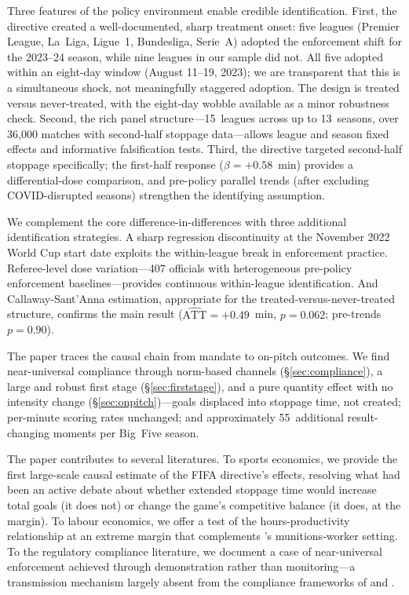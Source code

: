 \medskip

Three features of the policy environment enable credible identification.
First, the directive created a well-documented, sharp treatment onset:
five leagues (Premier League, La~Liga, Ligue~1, Bundesliga, Serie~A)
adopted the enforcement shift for the 2023--24 season, while nine
leagues in our sample did not.  All five adopted within an eight-day
window (August 11--19, 2023); we are transparent that this is a
simultaneous shock, not meaningfully staggered adoption.  The design is
treated versus never-treated, with the eight-day wobble available as a
minor robustness check.  Second, the rich panel structure---15~leagues across
up to 13~seasons, over 36,000 matches with second-half stoppage
data---allows league and season fixed effects and informative
falsification tests.
Third, the directive targeted second-half stoppage specifically; the
first-half response ($\beta = +0.58$~min) provides a differential-dose
comparison, and pre-policy parallel trends (after excluding COVID-disrupted
seasons) strengthen the identifying assumption.

We complement the core difference-in-differences with three additional
identification strategies.  A sharp regression discontinuity at the
November 2022 World Cup start date exploits the within-league break in
enforcement practice.  Referee-level dose variation---407 officials with
heterogeneous pre-policy enforcement baselines---provides continuous
within-league identification.  And Callaway-Sant'Anna estimation,
appropriate for the treated-versus-never-treated structure, confirms
the main result ($\hat{\text{ATT}} = +0.49$~min, $p = 0.062$; pre-trends
$p = 0.90$).

\medskip

The paper traces the causal chain from mandate to on-pitch outcomes.
We find near-universal compliance through norm-based channels
(\S\ref{sec:compliance}), a large and robust first stage
(\S\ref{sec:firststage}), and a pure quantity effect with no
intensity change (\S\ref{sec:onpitch})---goals displaced into
stoppage time, not created; per-minute scoring rates unchanged; and
approximately 55~additional result-changing moments per Big~Five
season.

The paper contributes to several literatures.  To sports economics, we
provide the first large-scale causal estimate of the FIFA directive's
effects, resolving what had been an active debate about whether extended
stoppage time would increase total goals (it does not) or change the
game's competitive balance (it does, at the margin).  To labour
economics, we offer a test of the hours-productivity relationship at an
extreme margin that complements \citet{pencavel2015effects}'s
munitions-worker setting.  To the regulatory compliance literature, we
document a case of near-universal enforcement achieved through
demonstration rather than monitoring---a transmission mechanism
largely absent from the compliance frameworks of
\citet{johnson2020compliance} and \citet{levine2012randomized}.


